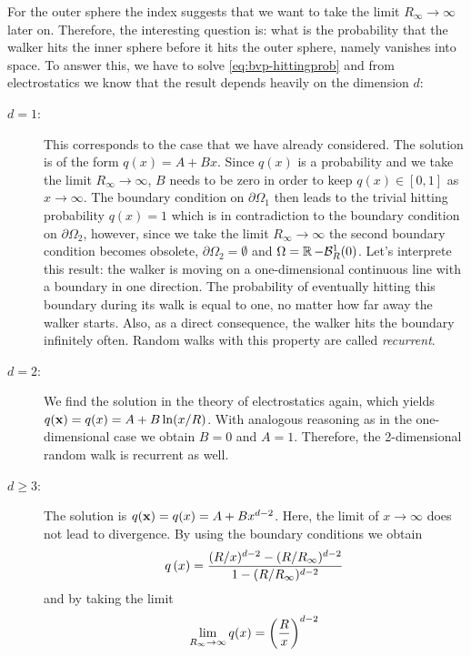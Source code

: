 For the outer sphere the index suggests that we want to take the limit $R_\infty \rightarrow \infty$ later on. Therefore, the interesting question is: what is the probability that the walker hits the inner sphere before it hits the outer sphere, namely vanishes into space. To answer this, we have to solve \autoref{eq:bvp-hittingprob} and from electrostatics we know that the result depends heavily on the dimension $d$:
\begin{description}
 \item[$d=1$:] This corresponds to the case that we have already considered. The solution is of the form $q(x) = A+Bx$. Since $q(x)$ is a probability and we take the limit $R_\infty \rightarrow \infty$, $B$ needs to be zero in order to keep $q(x) \in [0,1]$ as $x\rightarrow\infty$. The boundary condition on $\partial\Omega_1$ then leads to the trivial hitting probability $q(x)=1$ which is in contradiction to the boundary condition on $\partial\Omega_2$, however, since we take the limit $R_\infty \rightarrow \infty$ the second boundary condition becomes obsolete, \ie $\partial\Omega_2 = \emptyset$ and $\Omega = \operatorname{\mathbb{R}} - \mathcal{B}_R^1(0)$. Let's interprete this result: the walker is moving on a one-dimensional continuous line with a boundary in one direction. The probability of eventually hitting this boundary during its walk is equal to one, no matter how far away the walker starts. Also, as a direct consequence, the walker hits the boundary infinitely often. Random walks with this property are called \textit{recurrent}.
 \item[$d=2$:] We find the solution in the theory of electrostatics again, which yields $q(\mathbf{x}) = q(x) = A + B \ln(x/R)$. With analogous reasoning as in the one-dimensional case we obtain $B=0$ and $A=1$. Therefore, the 2-dimensional random walk is recurrent as well.
 \item[$d\geq3$:] The solution is $q(\mathbf{x}) = q(x) = A + B x^{d-2}$. Here, the limit of $x \rightarrow \infty$ does not lead to divergence. By using the boundary conditions we obtain
 \begin{equation}\label{eq:hittingprobd=3}
  q\left(x\right)=\frac{(R/x)^{d-2} - (R/R_\infty)^{d-2}}{1 - (R/R_\infty)^{d-2}}
 \end{equation}
 and by taking the limit
 \begin{equation}\label{eq:coulomb-formula}
  \lim\limits_{R_\infty\rightarrow\infty}{q(x)} = \left(\frac{R}{x}\right)^{d-2}
 \end{equation}

\end{description}
